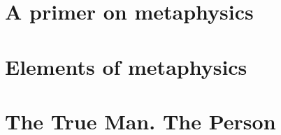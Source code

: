 \documentclass[a4paper,12pt,twoside]{book}
\begin{document}
\chapter{A primer on metaphysics}










\chapter{Elements of metaphysics}


















\chapter{The True Man. The Person}







\end{document}

